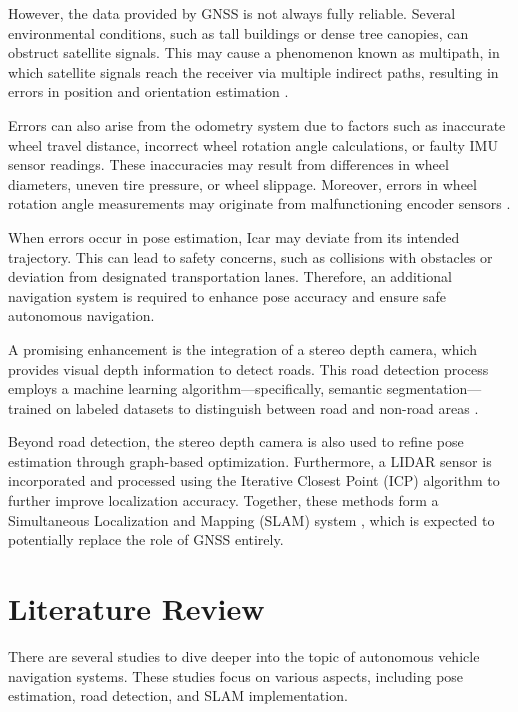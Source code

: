 \documentclass[conference]{IEEEtran}
\begin{document}
\par 
However, the data provided by GNSS is not always fully reliable. Several environmental conditions, such as tall buildings or dense tree canopies, can obstruct satellite signals. This may cause a phenomenon known as multipath, in which satellite signals reach the receiver via multiple indirect paths, resulting in errors in position and orientation estimation \cite{ref_gnss_multipath}.

\par 
Errors can also arise from the odometry system due to factors such as inaccurate wheel travel distance, incorrect wheel rotation angle calculations, or faulty IMU sensor readings. These inaccuracies may result from differences in wheel diameters, uneven tire pressure, or wheel slippage. Moreover, errors in wheel rotation angle measurements may originate from malfunctioning encoder sensors \cite{ref_odom_error}.

\par
When errors occur in pose estimation, Icar may deviate from its intended trajectory. This can lead to safety concerns, such as collisions with obstacles or deviation from designated transportation lanes. Therefore, an additional navigation system is required to enhance pose accuracy and ensure safe autonomous navigation.

\par
A promising enhancement is the integration of a stereo depth camera, which provides visual depth information to detect roads. This road detection process employs a machine learning algorithm—specifically, semantic segmentation—trained on labeled datasets to distinguish between road and non-road areas \cite{ref_mas_pandu}.

\par 
Beyond road detection, the stereo depth camera is also used to refine pose estimation through graph-based optimization. Furthermore, a LIDAR sensor is incorporated and processed using the Iterative Closest Point (ICP) algorithm to further improve localization accuracy. Together, these methods form a Simultaneous Localization and Mapping (SLAM) system \cite{thrun2005probabilistic}, which is expected to potentially replace the role of GNSS entirely.


\section{Literature Review}
There are several studies to dive deeper into the topic of autonomous vehicle navigation systems. These studies focus on various aspects, including pose estimation, road detection, and SLAM implementation.
\end{document}
